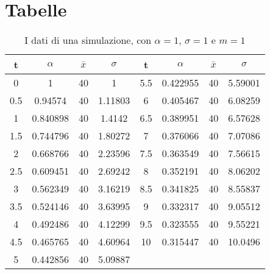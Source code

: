 \section{Tabelle}

\begin{table}[hbt]
	\centering
	\begin{tabular}{cccc|cccc}
		\toprule
		t	&$\alpha$	&$\bar x$& $\sigma$ &	t	&	$\alpha$	&$\bar x$& $\sigma$\\ \toprule
		0   & 1        & 40 & 1       & 5.5 & 0.422955 & 40 & 5.59001 \\ \midrule
		0.5 & 0.94574  & 40 & 1.11803 & 6   & 0.405467 & 40 & 6.08259 \\ \midrule
		1   & 0.840898 & 40 & 1.4142  & 6.5 & 0.389951 & 40 & 6.57628 \\ \midrule
		1.5 & 0.744796 & 40 & 1.80272 & 7   & 0.376066 & 40 & 7.07086 \\ \midrule
		2   & 0.668766 & 40 & 2.23596 & 7.5 & 0.363549 & 40 & 7.56615 \\ \midrule
		2.5 & 0.609451 & 40 & 2.69242 & 8   & 0.352191 & 40 & 8.06202 \\ \midrule
		3   & 0.562349 & 40 & 3.16219 & 8.5 & 0.341825 & 40 & 8.55837 \\ \midrule
		3.5 & 0.524146 & 40 & 3.63995 & 9   & 0.332317 & 40 & 9.05512 \\ \midrule
		4   & 0.492486 & 40 & 4.12299 & 9.5 & 0.323555 & 40 & 9.55221 \\ \midrule
		4.5 & 0.465765 & 40 & 4.60964 & 10  & 0.315447 & 40 & 10.0496 \\ \midrule
		5   & 0.442856 & 40 & 5.09887 &     &          &    &         \\ \bottomrule
	\end{tabular}
	\caption{I dati di una simulazione, con $\alpha = 1$, $\sigma=1$ e $m=1$ }\label{table:dispersioneg1}
\end{table}

